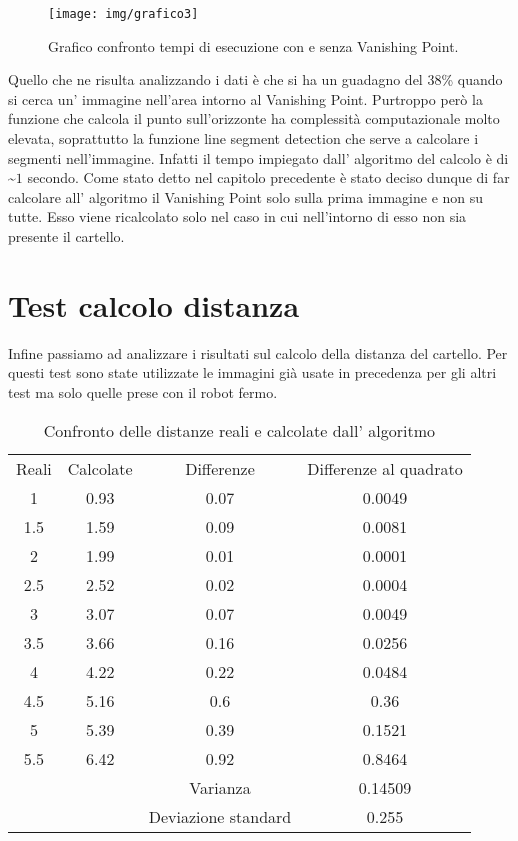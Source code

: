 	\begin{figure}[!ht]
		\centering
		\texttt{[image: img/grafico3]}
		\caption[Grafico tempi di esecuzione]{Grafico confronto tempi di esecuzione con e senza Vanishing Point.}
	\end{figure}

	Quello che ne risulta analizzando i dati è che si ha un guadagno del 38\% quando si cerca un' immagine nell'area intorno al Vanishing Point. Purtroppo però la funzione che calcola il punto sull'orizzonte ha complessità computazionale molto elevata, soprattutto la funzione line segment detection che serve a calcolare i segmenti nell'immagine. Infatti il tempo impiegato dall' algoritmo del calcolo è di \textasciitilde $1$ secondo. Come stato detto nel capitolo precedente è stato deciso dunque di far calcolare all' algoritmo il Vanishing Point solo sulla prima immagine e non su tutte. Esso viene ricalcolato solo nel caso in cui nell'intorno di esso non sia presente il cartello.

\section{Test calcolo distanza}

	Infine passiamo ad analizzare i risultati sul calcolo della distanza del cartello. Per questi test sono state utilizzate le immagini già usate in precedenza per gli altri test ma solo quelle prese con il robot fermo.

	\begin{table}[h]
		\centering
		\begin{tabular}{cccc}
		    Reali & Calcolate & Differenze & Differenze al quadrato \\
			1 	&   0.93	& 0.07		& 0.0049    	\\
			1.5 &   1.59    & 0.09 		& 0.0081 		\\
			2 	& 	1.99	& 0.01		& 0.0001 		\\
			2.5 &   2.52	& 0.02		& 0.0004		\\
			3	&   3.07	& 0.07		& 0.0049		\\
			3.5 &   3.66	& 0.16		& 0.0256		\\
			4 	&   4.22	& 0.22		& 0.0484		\\
			4.5 &   5.16	& 0.6		& 0.36			\\
			5 	&   5.39	& 0.39		& 0.1521		\\
			5.5 &   6.42	& 0.92		& 0.8464		\\
			\hline
			& & Varianza & 0.14509 \\
			& & Deviazione standard & 0.255 \\

		\end{tabular}
		\caption{Confronto delle distanze reali e calcolate dall' algoritmo}
	\end{table}


